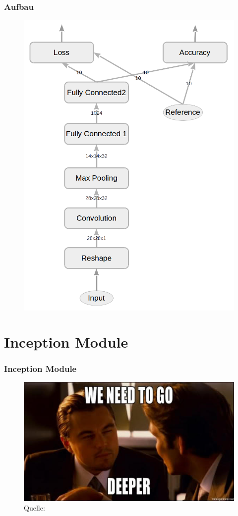 \documentclass{beamer}
\begin{document}
\begin{frame}
	\frametitle{Aufbau}
	\begin{figure}
		\includegraphics[width=0.4\linewidth]{images/main_graph_conv_reduced.png}
	\end{figure}
\end{frame}

\section{Inception Module}

\begin{frame}
	\frametitle{Inception Module}
	\begin{figure}
		\includegraphics[width=0.8\linewidth]{images/inception_meme.jpg}\\
		\hspace*{0pt}\hbox{\scriptsize Quelle:}
	\end{figure}
	
\end{frame}
\end{document}
